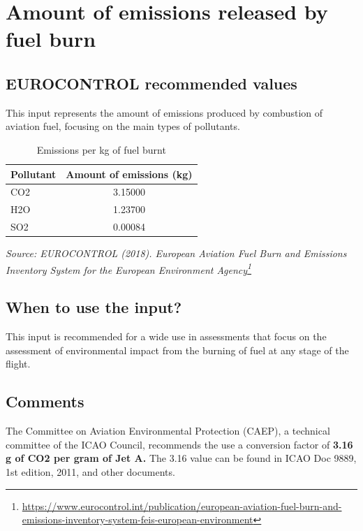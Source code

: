 \documentclass[
  11pt,
  a4paper,
]{book}
\DeclareRobustCommand{\href}[2]{#2\footnote{\url{#1}}}
\begin{document}
\hypertarget{sec-amount-of-emissions-released-by-fuel-burn}{%
\chapter{Amount of emissions released by fuel
burn}\label{sec-amount-of-emissions-released-by-fuel-burn}}

\hypertarget{eurocontrol-recommended-values-3}{%
\section{EUROCONTROL recommended
values}\label{eurocontrol-recommended-values-3}}

This input represents the amount of emissions produced by combustion of
aviation fuel, focusing on the main types of pollutants.

\hypertarget{tbl-emissions-per-kg-fuel}{}
\begin{longtable}{lc}
\caption{\label{tbl-emissions-per-kg-fuel}Emissions per kg of fuel burnt }\tabularnewline

\toprule
Pollutant & Amount of emissions (kg) \\ 
\midrule
CO2 & 3.15000 \\ 
H2O & 1.23700 \\ 
SO2 & 0.00084 \\ 
\bottomrule
\end{longtable}

\emph{Source:
\href{https://www.eurocontrol.int/publication/european-aviation-fuel-burn-and-emissions-inventory-system-feis-european-environment}{EUROCONTROL
(2018). European Aviation Fuel Burn and Emissions Inventory System for
the European Environment Agency}}

\hypertarget{when-to-use-the-input-3}{%
\section{When to use the input?}\label{when-to-use-the-input-3}}

This input is recommended for a wide use in assessments that focus on
the assessment of environmental impact from the burning of fuel at any
stage of the flight.

\hypertarget{comments-1}{%
\section{Comments}\label{comments-1}}

The Committee on Aviation Environmental Protection (CAEP), a technical
committee of the ICAO Council, recommends the use a conversion factor of
\textbf{3.16 g of CO2 per gram of Jet A.} The 3.16 value can be found in
ICAO Doc 9889, 1st edition, 2011, and other documents.
\end{document}

